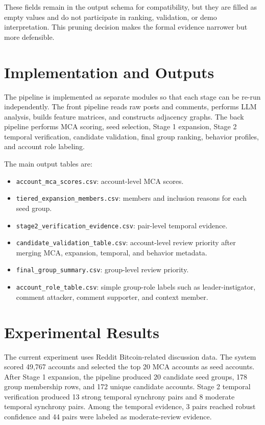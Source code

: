 \documentclass[conference]{IEEEtran}
\begin{document}
These fields remain in the output schema for compatibility, but they are
filled as empty values and do not participate in ranking, validation, or demo
interpretation. This pruning decision makes the formal evidence narrower but
more defensible.

\section{Implementation and Outputs}

The pipeline is implemented as separate modules so that each stage can be
re-run independently. The front pipeline reads raw posts and comments, performs
LLM analysis, builds feature matrices, and constructs adjacency graphs. The
back pipeline performs MCA scoring, seed selection, Stage 1 expansion, Stage 2
temporal verification, candidate validation, final group ranking, behavior
profiles, and account role labeling.

The main output tables are:
\begin{itemize}
  \item \texttt{account\_mca\_scores.csv}: account-level MCA scores.
  \item \texttt{tiered\_expansion\_members.csv}: members and inclusion reasons
  for each seed group.
  \item \texttt{stage2\_verification\_evidence.csv}: pair-level temporal
  evidence.
  \item \texttt{candidate\_validation\_table.csv}: account-level review
  priority after merging MCA, expansion, temporal, and behavior metadata.
  \item \texttt{final\_group\_summary.csv}: group-level review priority.
  \item \texttt{account\_role\_table.csv}: simple group-role labels such as
  leader-instigator, comment attacker, comment supporter, and context member.
\end{itemize}

\section{Experimental Results}

The current experiment uses Reddit Bitcoin-related discussion data. The system
scored 49,767 accounts and selected the top 20 MCA accounts as seed accounts.
After Stage 1 expansion, the pipeline produced 20 candidate seed groups, 178
group membership rows, and 172 unique candidate accounts. Stage 2 temporal
verification produced 13 strong temporal synchrony pairs and 8 moderate
temporal synchrony pairs. Among the temporal evidence, 3 pairs reached robust
confidence and 44 pairs were labeled as moderate-review evidence.
\end{document}
